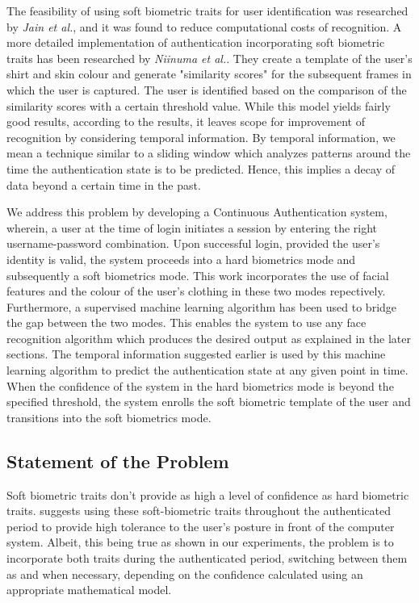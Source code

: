 \documentclass[12pt]{article}			%
\begin{document}
The feasibility of using soft biometric traits for user identification was researched by \emph{Jain et al.}\cite{Jain204}, and it was found to reduce computational costs of recognition.
A more detailed implementation of authentication incorporating soft biometric traits has been researched by \emph{Niinuma et al.}\cite{Niin10}.
They create a template of the user's shirt and skin colour and generate "similarity scores" for the subsequent frames in which the user is captured.
The user is identified based on the comparison of the similarity scores with a certain threshold value.
While this model yields fairly good results, according to the results, it leaves scope for improvement of recognition by considering temporal information.
By temporal information, we mean a technique similar to a sliding window which analyzes patterns around the time the authentication state is to be predicted.
Hence, this implies a decay of data beyond a certain time in the past.

We address this problem by developing a Continuous Authentication system, wherein, a user at the time of login initiates a session by entering the right username-password combination.
Upon successful login, provided the user's identity is valid, the system proceeds into a hard biometrics mode and subsequently a soft biometrics mode.
This work incorporates the use of facial features and the colour of the user's clothing in these two modes repectively. 
Furthermore, a supervised machine learning algorithm has been used to bridge the gap between the two modes.
This enables the system to use any face recognition algorithm which produces the desired output as explained in the later sections.
The temporal information suggested earlier is used by this machine learning algorithm to predict the authentication state at any given point in time.
When the confidence of the system in the hard biometrics mode is beyond the specified threshold, the system enrolls the soft biometric template of the user and transitions into the soft biometrics mode.

\subsection{ Statement of the Problem }

Soft biometric traits don't provide as high a level of confidence as hard biometric traits. \cite{Niin10} suggests using these soft-biometric traits throughout the authenticated period to provide high tolerance to the user's posture in front of the computer system. Albeit, this being true as shown in our experiments, the problem is to incorporate both traits during the authenticated period, switching between them as and when necessary, depending on the confidence calculated using an appropriate mathematical model.
\end{document}

